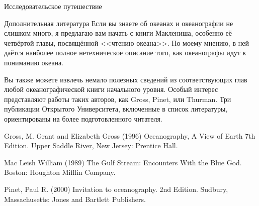 \begin{chapter}{Исследовательское путешествие}
\begin{section}{Дополнительная литература}
Если вы знаете об океанах и океанографии не слишком много, я предлагаю 
вам начать с книги Маклениша, особенно её четвёртой главы, посвящённой 
<<чтению океана>>. 
По моему мнению, в ней даётся наиболее полное нетехническое описание того, 
как океанографы идут к пониманию океана.
%

Вы также можете извлечь немало полезных сведений из соответствующих глав любой 
океанографической книги начального уровня. Особый интерес представляют работы 
таких авторов, как Gross, Pinet, или Thurman. Три публикации Открытого 
Университета, включенные в список литературы, ориентированы на более 
подготовленного читателя. 
%

Gross, M. Grant and Elizabeth Gross (1996) Oceanography, 
A View of Earth 7th Edition. Upper Saddle River, New Jersey: Prentice Hall. 
%

Mac Leish William (1989) The Gulf Stream: Encounters With the Blue God. 
Boston: Houghton Mifflin Company. 
%

Pinet, Paul R. (2000) Invitation to oceanography. 2nd Edition. Sudbury, 
Massachusetts: Jones and Bartlett Publishers.
%


\end{section}
\end{chapter}
